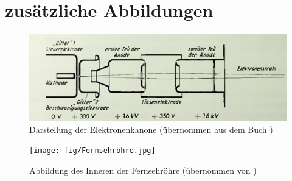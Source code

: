 \section{zusätzliche Abbildungen}

\begin{figure}[h]
    \centering
    \includegraphics[width=.9\textwidth]{fig/Elektronenstrahl.PNG}
    \caption{Darstellung der Elektronenkanone (übernommen aus dem Buch \cite{Fernsehroehre})}
    \label{fig:elS}
\end{figure}

\begin{figure}[h]
    \centering
    \texttt{[image: fig/Fernsehröhre.jpg]}
    \caption{Abbildung des Inneren der Fernsehröhre (übernommen von \cite{Abbildung}) }
    \label{fig:Fernsehroehre}
\end{figure}
